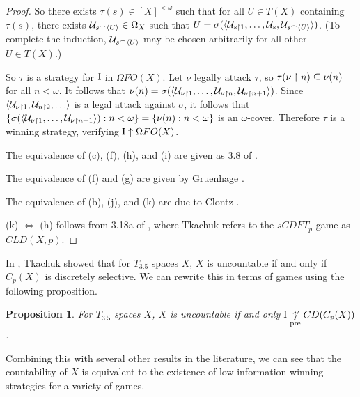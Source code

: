 \documentclass{amsart}
\theoremstyle{plain}
\newtheorem{proposition}[theorem]{Proposition}
\theoremstyle{definition}
\theoremstyle{remark}
\theoremstyle{plain}
\theoremstyle{definition}
\theoremstyle{remark}
\begin{document}
\begin{proof}
 So there exists \(\tau(s)\in[X]^{<\omega}\) such that for all \(U\in T(X)\) containing \(\tau(s)\), there exists \(\mathcal{U}_{s{^\frown}\langle U\rangle}\in\Omega_X\) such that \(U=\sigma(\langle\mathcal{U}_{s\restriction 1},\dots,\mathcal{U}_s,\mathcal{U}_{s{^\frown}\langle U\rangle}\rangle)\). 
 (To complete the induction, \(\mathcal{U}_{s{^\frown}\langle U\rangle}\) may be chosen arbitrarily for all other \(U\in T(X)\).)

 So \(\tau\) is a strategy for \(\mathrm{I}\) in \(\Omega FO(X)\). 
 Let \(\nu\) legally attack \(\tau\), so \(\tau(\nu\restriction n)\subseteq \nu(n)\) for all \(n<\omega\). 
 It follows that \(\nu(n)=\sigma(\langle\mathcal{U}_{\nu\restriction 1},\dots,\mathcal{U}_{\nu\restriction n},\mathcal{U}_{\nu\restriction n+1}\rangle)\). 
 Since \(\<\mc U_{\nu\rest 1},\mc U_{n\rest 2},\dots\>\) is a legal attack against \(\sigma\), it follows that \(\{\sigma(\langle\mathcal{U}_{\nu\restriction 1},\dots,\mathcal{U}_{\nu\restriction n+1}\rangle):n<\omega\}=\{\nu(n):n<\omega\}\) is an \(\omega\)-cover. 
 Therefore \(\tau\) is a winning strategy, verifying \(\mathrm{I}\uparrow\Omega FO(X)\).

 The equivalence of (c), (f), (h), and (i) are given as 3.8 of \cite{Tkachuk3}.

 The equivalence of (f) and (g) are given by Gruenhage \cite{Gruenhage1976}.
  
 The equivalence of (b), (j), and (k) are due to Clontz \cite{Clontz1}.

 (k) \(\Leftrightarrow\) (h) follows from 3.18a of \cite{Tkachuk3}, where
 Tkachuk refers to the \(sCDFT_p\) game as \(CLD(X,p)\).
\end{proof}

In \cite{Tkachuk2}, Tkachuk showed that for \(T_{3.5}\) spaces \(X\), \(X\) is uncountable if and only if \(C_p(X)\) is discretely selective.
We can rewrite this in terms of games using the following proposition.

\begin{proposition}
  For \(T_{3.5}\) spaces \(X\), \(X\) is uncountable if and only \(\mathrm{I}\underset{\text{pre}}{\not\uparrow} CD(C_p(X))\).
\end{proposition}


Combining this with several other results in the literature, we can see that the countability of \(X\) is equivalent to the existence of low information winning strategies for a variety of games.
\end{document}
